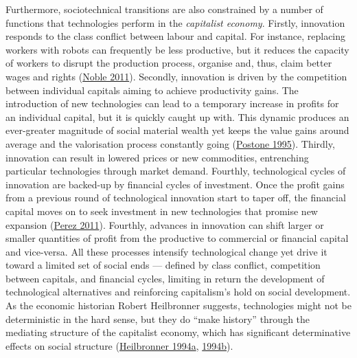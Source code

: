 \documentclass[a4paper, nobind]{templates/ociamthesis}
\begin{document}
Furthermore, sociotechnical transitions are also constrained by a number of functions that technologies perform in the \emph{capitalist economy}. Firstly, innovation responds to the class conflict between labour and capital. For instance, replacing workers with robots can frequently be less productive, but it reduces the capacity of workers to disrupt the production process, organise and, thus, claim better wages and rights (\protect\hyperlink{ref-noble_forces_2011}{Noble 2011}). Secondly, innovation is driven by the competition between individual capitals aiming to achieve productivity gains. The introduction of new technologies can lead to a temporary increase in profits for an individual capital, but it is quickly caught up with. This dynamic produces an ever-greater magnitude of social material wealth yet keeps the value gains around average and the valorisation process constantly going (\protect\hyperlink{ref-postone_time_1995}{Postone 1995}). Thirdly, innovation can result in lowered prices or new commodities, entrenching particular technologies through market demand. Fourthly, technological cycles of innovation are backed-up by financial cycles of investment. Once the profit gains from a previous round of technological innovation start to taper off, the financial capital moves on to seek investment in new technologies that promise new expansion (\protect\hyperlink{ref-perez_finance_2011}{Perez 2011}). Fourthly, advances in innovation can shift larger or smaller quantities of profit from the productive to commercial or financial capital and vice-versa. All these processes intensify technological change yet drive it toward a limited set of social ends --- defined by class conflict, competition between capitals, and financial cycles, limiting in return the development of technological alternatives and reinforcing capitalism's hold on social development. As the economic historian Robert Heilbronner suggests, technologies might not be deterministic in the hard sense, but they do ``make history'' through the mediating structure of the capitalist economy, which has significant determinative effects on social structure (\protect\hyperlink{ref-heilbronner_machines_1994}{Heilbronner 1994a}, \protect\hyperlink{ref-heilbronner_technological_1994}{1994b}).
\end{document}
